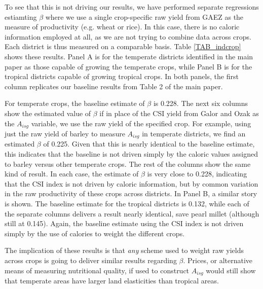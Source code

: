 \documentclass[11pt]{article}
\begin{document}
To see that this is not driving our results, we have performed separate regressions estiamting $\beta$ where we use a single crop-specific raw yield from GAEZ as the measure of productivity (e.g. wheat or rice). In this case, there is no caloric information employed at all, as we are not trying to combine data across crops. Each district is thus measured on a comparable basis. Table \ref{TAB_indcrop} shows these results. Panel A is for the temperate districts identified in the main paper as those capable of growing the temperate crops, while Panel B is for the tropical districts capable of growing tropical crops. In both panels, the first column replicates our baseline results from Table 2 of the main paper.

For temperate crops, the baseline estimate of $\beta$ is 0.228. The next six columns show the estimated value of $\beta$ if in place of the CSI yield from Galor and Ozak as the $A_{isg}$ variable, we use the raw yield of the specified crop. For example, using just the raw yield of barley to measure $A_{isg}$ in temperate districts, we find an estimated $\beta$ of 0.225. Given that this is nearly identical to the baseline estimate, this indicates that the baseline is not driven simply by the caloric values assigned to barley versus other temperate crops. The rest of the columns show the same kind of result. In each case, the estimate of $\beta$ is very close to 0.228, indicating that the CSI index is not driven by caloric information, but by common variation in the raw productivity of these crops across districts. In Panel B, a similar story is shown. The baseline estimate for the tropical districts is 0.132, while each of the separate columns delivers a result nearly identical, save pearl millet (although still at 0.145). Again, the baseline estimate using the CSI index is not driven simply by the use of calories to weight the different crops.

The implication of these results is that \textit{any} scheme used to weight raw yields across crops is going to deliver similar results regarding $\beta$. Prices, or alternative means of measuring nutritional quality, if used to construct $A_{isg}$ would still show that temperate areas have larger land elasticities than tropical areas.
\end{document}
